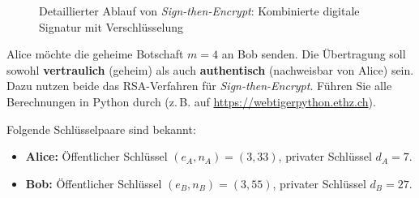 \begin{figure}[H]
	\centering
	
	\caption{Detaillierter Ablauf von \emph{Sign-then-Encrypt}: Kombinierte digitale Signatur mit Verschlüsselung}
	\label{fig:sign-then-encrypt-detail}
\end{figure}

\begin{myexercise}
	Alice möchte die geheime Botschaft $m = 4$ an Bob senden. Die Übertragung soll sowohl \textbf{vertraulich} (geheim) als auch \textbf{authentisch} (nachweisbar von Alice) sein. Dazu nutzen beide das \gls{RSA}-Verfahren für \emph{Sign-then-Encrypt}. Führen Sie alle Berechnungen in Python durch (z.\,B. auf \url{https://webtigerpython.ethz.ch}).

	Folgende Schlüsselpaare sind bekannt:
	\begin{itemize}
		\item \textbf{Alice:} Öffentlicher Schlüssel $(e_A, n_A) = (3, 33)$, privater Schlüssel $d_A = 7$.
		\item \textbf{Bob:} Öffentlicher Schlüssel $(e_B, n_B) = (3, 55)$, privater Schlüssel $d_B = 27$.
	\end{itemize}


\end{myexercise}
